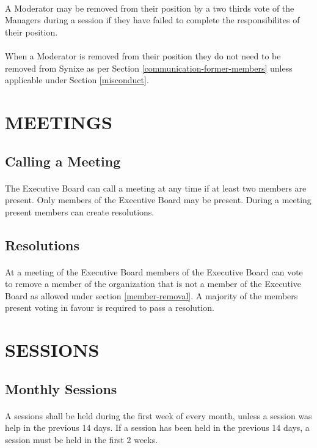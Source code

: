 \documentclass[10pt,a4paper]{article}
\begin{document}
\paragraph{}
A Moderator may be removed from their position by a two thirds vote of the Managers during a session if they have failed to complete the responsibilites of their position.
\paragraph{}
When a Moderator is removed from their position they do not need to be removed from Synixe as per Section \ref{communication-former-members} unless applicable under Section \ref{misconduct}.
\section{MEETINGS}
\subsection{Calling a Meeting}
\paragraph{}
The Executive Board can call a meeting at any time if at least two members are present. Only members of the Executive Board may be present. During a meeting present members can create resolutions.
\subsection{Resolutions}
\paragraph{}
At a meeting of the Executive Board members of the Executive Board can vote to remove a member of the organization that is not a member of the Executive Board as allowed under section \ref{member-removal}. A majority of the members present voting in favour is required to pass a resolution.
\section{SESSIONS}
\subsection{Monthly Sessions}
\paragraph{}
A sessions shall be held during the first week of every month, unless a session was help in the previous 14 days. If a session has been held in the previous 14 days, a session must be held in the first 2 weeks.
\end{document}
